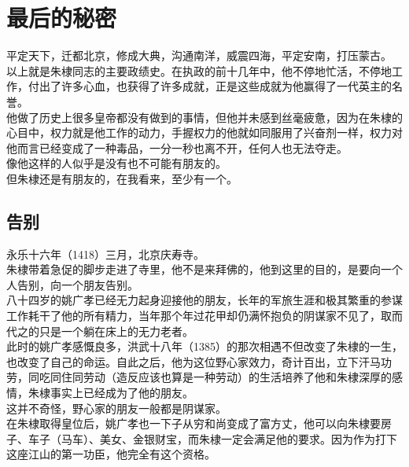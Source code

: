\section{最后的秘密}
\ifnum{}
	\begin{multicols}{\theparacolNo}
\fi
平定天下，迁都北京，修成大典，沟通南洋，威震四海，平定安南，打压蒙古。\\

以上就是朱棣同志的主要政绩史。在执政的前十几年中，他不停地忙活，不停地工作，付出了许多心血，也获得了许多成就，正是这些成就为他赢得了一代英主的名誉。\\

他做了历史上很多皇帝都没有做到的事情，但他并未感到丝毫疲惫，因为在朱棣的心目中，权力就是他工作的动力，手握权力的他就如同服用了兴奋剂一样，权力对他而言已经变成了一种毒品，一分一秒也离不开，任何人也无法夺走。\\

像他这样的人似乎是没有也不可能有朋友的。\\

但朱棣还是有朋友的，在我看来，至少有一个。\\

\subsection{告别}
永乐十六年（1418）三月，北京庆寿寺。\\

朱棣带着急促的脚步走进了寺里，他不是来拜佛的，他到这里的目的，是要向一个人告别，向一个朋友告别。\\

八十四岁的姚广孝已经无力起身迎接他的朋友，长年的军旅生涯和极其繁重的参谋工作耗干了他的所有精力，当年那个年过花甲却仍满怀抱负的阴谋家不见了，取而代之的只是一个躺在床上的无力老者。\\

此时的姚广孝感慨良多，洪武十八年（1385）的那次相遇不但改变了朱棣的一生，也改变了自己的命运。自此之后，他为这位野心家效力，奇计百出，立下汗马功劳，同吃同住同劳动（造反应该也算是一种劳动）的生活培养了他和朱棣深厚的感情，朱棣事实上已经成为了他的朋友。\\

这并不奇怪，野心家的朋友一般都是阴谋家。\\

在朱棣取得皇位后，姚广孝也一下子从穷和尚变成了富方丈，他可以向朱棣要房子、车子（马车）、美女、金银财宝，而朱棣一定会满足他的要求。因为作为打下这座江山的第一功臣，他完全有这个资格。\\


\end{multicols}
